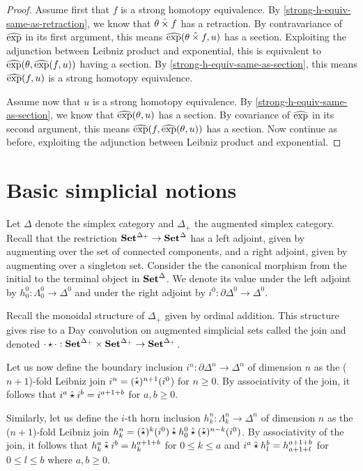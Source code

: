 \documentclass[reqno,10pt,a4paper,oneside]{amsart}
\begin{document}
\begin{proof}
Assume first that $f$ is a strong homotopy equivalence.
By \cref{strong-h-equiv-same-as-retraction}, we know that $\theta \mathbin{\hat{\times}} f$ has a retraction.
By contravariance of $\operatorname{\widehat{exp}}$ in its first argument, this means $\operatorname{\widehat{exp}}(\theta \mathbin{\hat{\times}} f, u)$ has a section.
Exploiting the adjunction between Leibniz product and exponential, this is equivalent to $\operatorname{\widehat{exp}}(\theta, \operatorname{\widehat{exp}}(f, u))$ having a section.
By \cref{strong-h-equiv-same-as-section}, this means $\operatorname{\widehat{exp}}(f, u)$ is a strong homotopy equivalence.

Assume now that $u$ is a strong homotopy equivalence.
By \cref{strong-h-equiv-same-as-section}, we know that $\operatorname{\widehat{exp}}(\theta, u)$ has a section.
By covariance of $\operatorname{\widehat{exp}}$ in its second argument, this means $\operatorname{\widehat{exp}}(f, \operatorname{\widehat{exp}}(\theta, u))$ has a section.
Now continue as before, exploiting the adjunction between Leibniz product and exponential.
\end{proof}

\section{Basic simplicial notions}

Let $\Delta$ denote the simplex category and $\Delta_+$ the augmented simplex category.
Recall that the restriction $\mathbf{Set}^{\Delta_+} \to \mathbf{Set}^{\Delta}$ has a left adjoint, given by augmenting over the set of connected components, and a right adjoint, given by augmenting over a singleton set.
Consider the the canonical morphism from the initial to the terminal object in $\mathbf{Set}^{\Delta}$.
We denote its value under the left adjoint by $h_0^0 : \Lambda_0^0 \to \Delta^0$ and under the right adjoint by $i^0 : \partial \Delta^0 \to \Delta^0$.

Recall the monoidal structure of $\Delta_+$ given by ordinal addition.
This structure gives rise to a Day convolution on augmented simplicial sets called the join and denoted $\mathop{\cdot} \star \mathop{\cdot} : \mathbf{Set}^{\Delta_+} \times \mathbf{Set}^{\Delta_+} \to \mathbf{Set}^{\Delta_+}$.

Let us now define the boundary inclusion $i^n : \partial \Delta^n \to \Delta^n$ of dimension $n$ as the ($n+1$)-fold Leibniz join $i^n = (\mathbin{\hat{\star}})^{n+1}(i^0$) for $n \geq 0$.
By associativity of the join, it follows that $i^a \mathbin{\hat{\star}} i^b = i^{a+1+b}$ for $a, b \geq 0$.

Similarly, let us define the $i$-th horn inclusion $h_k^n : \Lambda_k^n \to \Delta^n$ of dimension $n$ as the ($n+1$)-fold Leibniz join $h_k^n = (\mathbin{\hat{\star}})^k(i^0) \mathbin{\hat{\star}} h_0^0 \mathbin{\hat{\star}} (\mathbin{\hat{\star}})^{n-k}(i^0)$.
By associativity of the join, it follows that $h_k^a \mathbin{\hat{\star}} i^b = h_k^{a+1+b}$ for $0 \leq k \leq a$ and $i^a \mathbin{\hat{\star}} h_l^b = h_{a+1+l}^{a+1+b}$ for $0 \leq l \leq b$ where $a, b \geq 0$.
\end{document}
